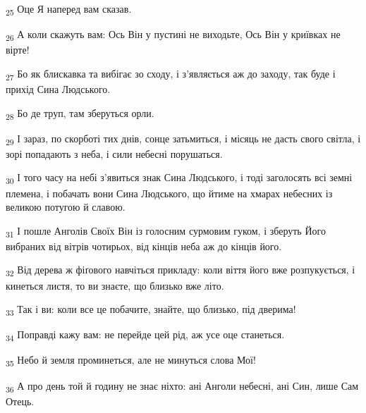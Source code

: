 \begin{tcolorbox}
\textsubscript{25} Оце Я наперед вам сказав.
\end{tcolorbox}
\begin{tcolorbox}
\textsubscript{26} А коли скажуть вам: Ось Він у пустині не виходьте, Ось Він у криївках не вірте!
\end{tcolorbox}
\begin{tcolorbox}
\textsubscript{27} Бо як блискавка та вибігає зо сходу, і з'являється аж до заходу, так буде і прихід Сина Людського.
\end{tcolorbox}
\begin{tcolorbox}
\textsubscript{28} Бо де труп, там зберуться орли.
\end{tcolorbox}
\begin{tcolorbox}
\textsubscript{29} І зараз, по скорботі тих днів, сонце затьмиться, і місяць не дасть свого світла, і зорі попадають з неба, і сили небесні порушаться.
\end{tcolorbox}
\begin{tcolorbox}
\textsubscript{30} І того часу на небі з'явиться знак Сина Людського, і тоді заголосять всі земні племена, і побачать вони Сина Людського, що йтиме на хмарах небесних із великою потугою й славою.
\end{tcolorbox}
\begin{tcolorbox}
\textsubscript{31} І пошле Анголів Своїх Він із голосним сурмовим гуком, і зберуть Його вибраних від вітрів чотирьох, від кінців неба аж до кінців його.
\end{tcolorbox}
\begin{tcolorbox}
\textsubscript{32} Від дерева ж фіґового навчіться прикладу: коли віття його вже розпукується, і кинеться листя, то ви знаєте, що близько вже літо.
\end{tcolorbox}
\begin{tcolorbox}
\textsubscript{33} Так і ви: коли все це побачите, знайте, що близько, під дверима!
\end{tcolorbox}
\begin{tcolorbox}
\textsubscript{34} Поправді кажу вам: не перейде цей рід, аж усе оце станеться.
\end{tcolorbox}
\begin{tcolorbox}
\textsubscript{35} Небо й земля проминеться, але не минуться слова Мої!
\end{tcolorbox}
\begin{tcolorbox}
\textsubscript{36} А про день той й годину не знає ніхто: ані Анголи небесні, ані Син, лише Сам Отець.
\end{tcolorbox}
